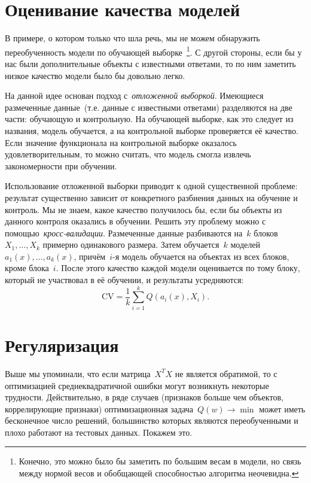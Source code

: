\documentclass[12pt,fleqn]{article}
\begin{document}
\section{Оценивание качества моделей}

В примере, о котором только что шла речь, мы не можем обнаружить переобученность модели
по обучающей выборке~\footnote{Конечно, это можно было бы заметить по большим весам в модели,
но связь между нормой весов и обобщающей способностью алгоритма неочевидна.}.
С другой стороны, если бы у нас были дополнительные объекты с известными ответами,
то по ним заметить низкое качество модели было бы довольно легко.

На данной идее основан подход с~\emph{отложенной выборкой}.
Имеющиеся размеченные данные~(т.е. данные с известными ответами)
разделяются на две части: обучающую и контрольную.
На обучающей выборке, как это следует из названия, модель обучается,
а на контрольной выборке проверяется её качество.
Если значение функционала на контрольной выборке оказалось удовлетворительным,
то можно считать, что модель смогла извлечь закономерности при обучении.

Использование отложенной выборки приводит к одной существенной проблеме:
результат существенно зависит от конкретного разбиения данных на обучение и контроль.
Мы не знаем, какое качество получилось бы, если бы объекты из данного
контроля оказались в обучении.
Решить эту проблему можно с помощью~\emph{кросс-валидации}.
Размеченные данные разбиваются на~$k$ блоков~$X_1, \dots, X_k$ примерно одинакового размера.
Затем обучается~$k$ моделей~$a_1(x), \dots, a_k(x)$, причём~$i$-я модель обучается на объектах из всех блоков,
кроме блока~$i$.
После этого качество каждой модели оценивается по тому блоку, который не участвовал в её обучении,
и результаты усредняются:
\[
    \text{CV}
    =
    \frac{1}{k}
    \sum_{i = 1}^{k}
        Q\left( a_i(x), X_i \right).
\]

\section{Регуляризация}

Выше мы упоминали, что если матрица~$X^T X$ не является обратимой,
то с оптимизацией среднеквадратичной ошибки могут возникнуть некоторые трудности.
Действительно, в ряде случаев (признаков больше чем объектов, коррелирующие признаки)
оптимизационная задача~$Q(w) \to \min$ может иметь бесконечное число решений,
большинство которых являются переобученными и плохо работают на тестовых данных.
Покажем это.
\end{document}
